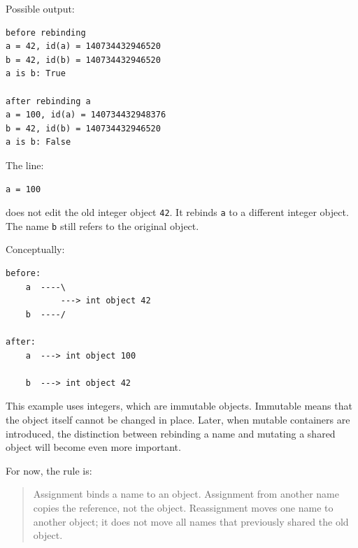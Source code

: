Possible output:

\begin{verbatim}
before rebinding
a = 42, id(a) = 140734432946520
b = 42, id(b) = 140734432946520
a is b: True

after rebinding a
a = 100, id(a) = 140734432948376
b = 42, id(b) = 140734432946520
a is b: False
\end{verbatim}

The line:

\begin{verbatim}
a = 100
\end{verbatim}

does not edit the old integer object \texttt{42}. It rebinds \texttt{a} to a different integer object. The name \texttt{b} still refers to the original object.

Conceptually:

\begin{verbatim}
before:
    a  ----\
           ---> int object 42
    b  ----/

after:
    a  ---> int object 100

    b  ---> int object 42
\end{verbatim}

This example uses integers, which are immutable objects. Immutable means that the object itself cannot be changed in place. Later, when mutable containers are introduced, the distinction between rebinding a name and mutating a shared object will become even more important.

For now, the rule is:

\begin{quote}
Assignment binds a name to an object. Assignment from another name copies the reference, not the object. Reassignment moves one name to another object; it does not move all names that previously shared the old object.
\end{quote}